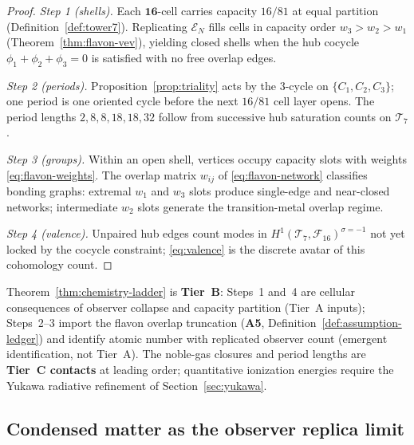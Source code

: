 \begin{proof}
\emph{Step 1 (shells).}
Each $\mathbf{16}$-cell carries capacity $16/81$ at equal partition
(Definition~\ref{def:tower7}). Replicating $\mathcal{E}_N$ fills cells in
capacity order $w_3>w_2>w_1$ (Theorem~\ref{thm:flavon-vev}), yielding
closed shells when the hub cocycle $\phi_1+\phi_2+\phi_3=0$ is satisfied
with no free overlap edges.

\emph{Step 2 (periods).}
Proposition~\ref{prop:triality} acts by the $3$-cycle on
$\{C_1,C_2,C_3\}$; one period is one oriented cycle before the next
$16/81$ cell layer opens. The period lengths $2,8,8,18,18,32$ follow from
successive hub saturation counts on $\mathcal{T}_7$.

\emph{Step 3 (groups).}
Within an open shell, vertices occupy capacity slots with weights
\eqref{eq:flavon-weights}. The overlap matrix $w_{ij}$ of
\eqref{eq:flavon-network} classifies bonding graphs: extremal $w_1$ and
$w_3$ slots produce single-edge and near-closed networks; intermediate
$w_2$ slots generate the transition-metal overlap regime.

\emph{Step 4 (valence).}
Unpaired hub edges count modes in $H^1(\mathcal{T}_7,\mathcal{F}_{16})^{\sigma=-1}$
not yet locked by the cocycle constraint; \eqref{eq:valence} is the
discrete avatar of this cohomology count.
\end{proof}

\begin{remark}
Theorem~\ref{thm:chemistry-ladder} is \textbf{Tier~B}: Steps~1 and~4 are
cellular consequences of observer collapse and capacity partition
(Tier~A inputs); Steps~2--3 import the flavon overlap truncation
(\textbf{A5}, Definition~\ref{def:assumption-ledger}) and identify atomic
number with replicated observer count (emergent identification, not Tier~A).
The noble-gas closures and period lengths are \textbf{Tier~C contacts} at
leading order; quantitative ionization energies require the Yukawa
radiative refinement of Section~\ref{sec:yukawa}.
\end{remark}

\subsection{Condensed matter as the observer replica limit}
\label{sec:emergent:condensed}

